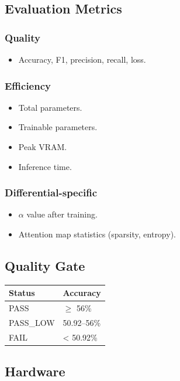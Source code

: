 \subsection{Evaluation Metrics}

\subsubsection{Quality}
\begin{itemize}
\item Accuracy, F1, precision, recall, loss.

\end{itemize}
\subsubsection{Efficiency}
\begin{itemize}
\item Total parameters.
\item Trainable parameters.
\item Peak VRAM.
\item Inference time.

\end{itemize}
\subsubsection{Differential-specific}
\begin{itemize}
\item $\alpha$ value after training.
\item Attention map statistics (sparsity, entropy).

\end{itemize}
\subsection{Quality Gate}

\begin{table}[H]
\centering
\small
\begin{tabular}{ll}
\toprule
\textbf{Status} & \textbf{Accuracy} \\
\midrule
PASS & $\ge$ 56\% \\
PASS\_LOW & 50.92--56\% \\
FAIL & < 50.92\% \\
\bottomrule
\end{tabular}
\end{table}

\subsection{Hardware}

